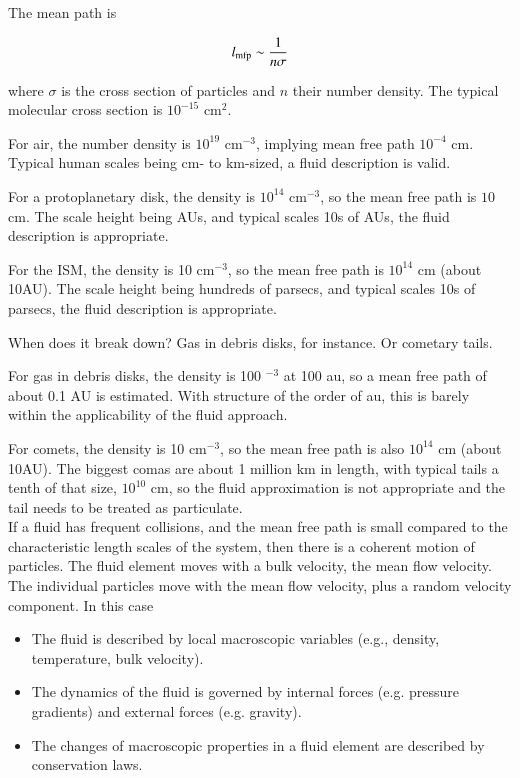 The mean path is

\begin{equation}
    l_{\rm mfp} \sim \frac{1}{n \sigma}
\end{equation}

\noindent where $\sigma$ is the cross section of particles and $n$ their number
density. The typical molecular cross section is $10^{-15}$ cm$^{2}$.

For air, the number density is $10^{19}$ cm$^{-3}$, implying mean free path
$10^{-4}$ cm. Typical human scales being cm- to km-sized, a fluid
description is valid. 

For a protoplanetary disk, the density is $10^{14}$ cm$^{-3}$, so the mean
free path is $10$ cm. The scale height being AUs, and typical scales
10s of AUs, the fluid description is appropriate. 

For the ISM, the density is 10 cm$^{-3}$, so the mean
free path is $10^{14}$ cm (about 10AU). The scale height being
hundreds of parsecs, and typical scales 10s of parsecs, the fluid
description is appropriate.

When does it break down? Gas in debris disks, for instance. Or
cometary tails.

For gas in debris disks, the density is 100 $^{-3}$ at 100 au, so a
mean free path of about 0.1 AU is estimated. With structure of the
order of au, this is barely within the applicability of the fluid
approach.  

For comets, the density is 10 cm$^{-3}$, so the mean
free path is also $10^{14}$ cm (about 10AU). The biggest comas are about 1
million km in length, with typical tails a tenth of that size,
$10^{10}$ cm, so the fluid approximation is not appropriate and the
tail needs to be treated as particulate.\\ 

If a fluid has frequent collisions, and the mean free path
is small compared to the characteristic length scales of the system,
then there is a coherent motion of particles. The fluid element moves
with a bulk velocity, the mean flow velocity. The individual particles
move with the mean flow velocity, plus a random velocity component. In
this case 

\begin{itemize}
\item The fluid is described by local macroscopic variables (e.g., density,
temperature, bulk velocity).

\item The dynamics of the fluid is governed by internal forces
(e.g. pressure gradients) and external forces (e.g. gravity).

\item The changes of macroscopic properties in a fluid element are described
by conservation laws.
\end{itemize}

